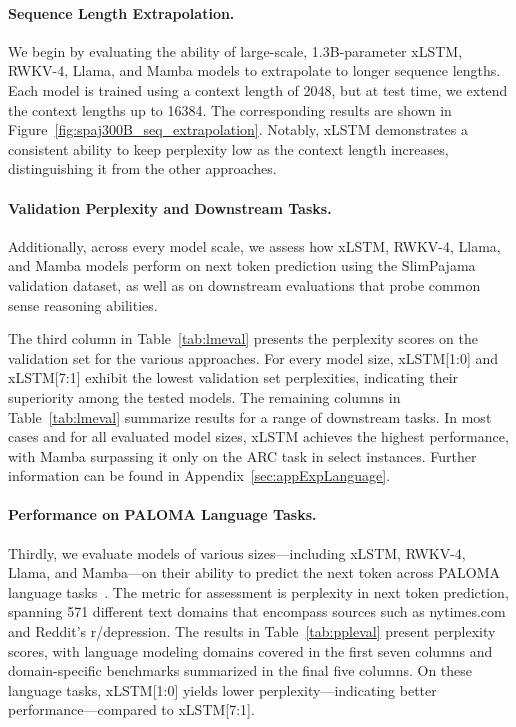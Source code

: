 \paragraph{Sequence Length Extrapolation.}
\label{sec:spaj300B_ctx_extrapolation}
We begin by evaluating the ability of large-scale, 1.3B-parameter xLSTM, RWKV-4, Llama, and Mamba models to extrapolate to longer sequence lengths. Each model is trained using a context length of 2048, but at test time, we extend the context lengths up to 16384. The corresponding results are shown in Figure~\ref{fig:spaj300B_seq_extrapolation}. Notably, xLSTM demonstrates a consistent ability to keep perplexity low as the context length increases, distinguishing it from the other approaches.

\paragraph{Validation Perplexity and Downstream Tasks.}
\label{sec:spaj_downstream_eval}
Additionally, across every model scale, we assess how xLSTM, RWKV-4, Llama, and Mamba models perform on next token prediction using the SlimPajama validation dataset, as well as on downstream evaluations that probe common sense reasoning abilities.

The third column in Table~\ref{tab:lmeval} presents the perplexity scores on the validation set for the various approaches. For every model size, xLSTM[1:0] and xLSTM[7:1] exhibit the lowest validation set perplexities, indicating their superiority among the tested models. The remaining columns in Table~\ref{tab:lmeval} summarize results for a range of downstream tasks. In most cases and for all evaluated model sizes, xLSTM achieves the highest performance, with Mamba surpassing it only on the ARC task in select instances. Further information can be found in Appendix~\ref{sec:appExpLanguage}.

\paragraph{Performance on PALOMA Language Tasks.} Thirdly, we evaluate models of various sizes—including xLSTM, RWKV-4, Llama, and Mamba—on their ability to predict the next token across PALOMA language tasks~\citep{Magnusson:23arxivshort}. The metric for assessment is perplexity in next token prediction, spanning 571 different text domains that encompass sources such as nytimes.com and Reddit’s r/depression.
The results in Table~\ref{tab:ppleval} present perplexity scores, with language modeling domains covered in the first seven columns and domain-specific benchmarks summarized in the final five columns. On these language tasks, xLSTM[1:0] yields lower perplexity—indicating better performance—compared to xLSTM[7:1].

